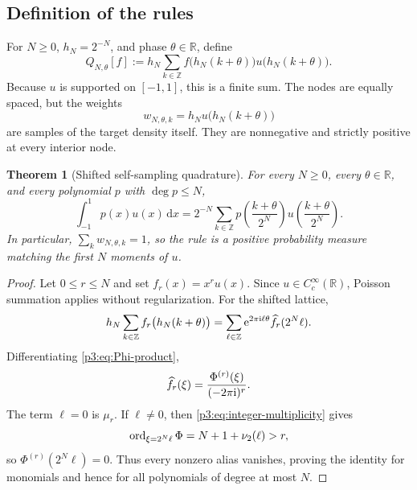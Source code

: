 \documentclass[11pt,oneside]{article}
\numberwithin{equation}{section}
\newtheorem{theorem}{Theorem}[section]
\theoremstyle{definition}
\theoremstyle{remark}
\newcommand{\R}{\mathbb R}
\newcommand{\Z}{\mathbb Z}
\newcommand{\e}{\mathrm e}
\newcommand{\dd}{\,\mathrm d}
\begin{document}
\subsection{Definition of the rules}

For $N\ge0$, $h_N=2^{-N}$, and phase $\theta\in\R$, define
\begin{equation}
 Q_{N,\theta}[f]
 :=h_N\sum_{k\in\Z}
 f\bigl(h_N(k+\theta)\bigr)
 u\bigl(h_N(k+\theta)\bigr).
 \label{p3:eq:Q-def}
\end{equation}
Because $u$ is supported on $[-1,1]$, this is a finite sum.  The nodes are equally spaced, but the weights
\begin{equation}
 w_{N,\theta,k}=h_Nu\bigl(h_N(k+\theta)\bigr)
 \label{p3:eq:self-weights}
\end{equation}
are samples of the target density itself.  They are nonnegative and strictly positive at every interior node.

\begin{theorem}[Shifted self-sampling quadrature]
\label{p3:thm:self-sampling}
For every $N\ge0$, every $\theta\in\R$, and every polynomial $p$ with $\deg p\le N$,
\begin{equation}
 \boxed{\displaystyle
 \int_{-1}^{1}p(x)u(x)\dd x
 =2^{-N}\sum_{k\in\Z}
 p\!\left(\frac{k+\theta}{2^N}\right)
 u\!\left(\frac{k+\theta}{2^N}\right).}
 \label{p3:eq:self-sampling-main}
\end{equation}
In particular, $\sum_k w_{N,\theta,k}=1$, so the rule is a positive probability measure matching the first $N$ moments of $u$.
\end{theorem}

\begin{proof}
Let $0\le r\le N$ and set $f_r(x)=x^ru(x)$.  Since $u\in C_c^\infty(\R)$, Poisson summation applies without regularization.  For the shifted lattice,
\begin{equation}
 h_N\sum_{k\in\Z}f_r\bigl(h_N(k+\theta)\bigr)
 =\sum_{\ell\in\Z}\e^{2\pi\iu\ell\theta}
 \widehat f_r(2^N\ell).
 \label{p3:eq:shifted-Poisson}
\end{equation}
Differentiating \eqref{p3:eq:Phi-product},
\begin{equation}
 \widehat f_r(\xi)=\frac{\Phi^{(r)}(\xi)}{(-2\pi\mathrm i)^r}.
 \label{p3:eq:monomial-transform}
\end{equation}
The term $\ell=0$ is $\mu_r$.  If $\ell\ne0$, then \eqref{p3:eq:integer-multiplicity} gives
\[
 \operatorname{ord}_{\xi=2^N\ell}\Phi
 =N+1+\nu_2(\ell)>r,
\]
so $\Phi^{(r)}(2^N\ell)=0$.  Thus every nonzero alias vanishes, proving the identity for monomials and hence for all polynomials of degree at most $N$.
\end{proof}
\end{document}
